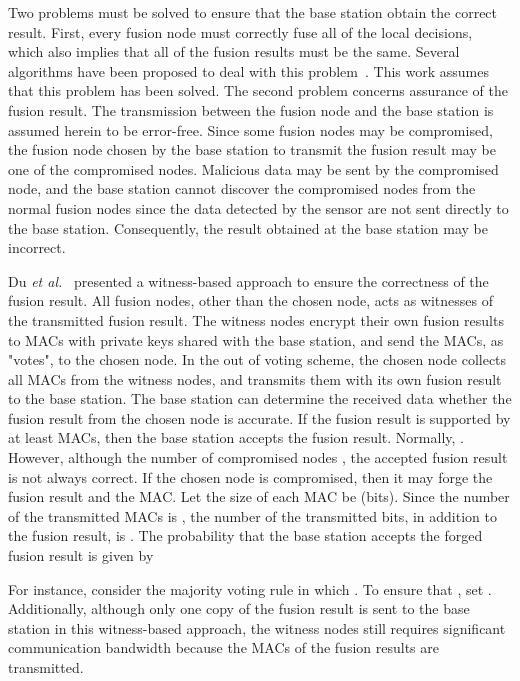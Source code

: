 \documentclass[12pt, onecolumn, draftcls]{IEEEtran}
\begin{document}
Two problems must be solved to ensure that the base station obtain
the correct result. First, every fusion node must correctly fuse all
of the local decisions, which also implies that all of the fusion
results must be the same. Several algorithms have been proposed to
deal with this
problem~\cite{varshney:dd,costa:dc,wang:dc_ft,wang:df_cc}. This work
assumes that this problem has been solved. The second problem
concerns assurance of the fusion result. The transmission between
the fusion node and the base station is assumed herein to be
error-free. Since some fusion nodes may be compromised, the fusion
node chosen by the base station to transmit the fusion result may be
one of the compromised nodes. Malicious data may be sent by the
compromised node, and the base station cannot discover the
compromised nodes from the normal fusion nodes since the data
detected by the sensor are not sent directly to the base station.
Consequently, the result obtained at the base station may be
incorrect.

Du {\it et al.}~\cite{du:assurance} presented a witness-based
approach to ensure the correctness of the fusion result. All fusion
nodes, other than the chosen node, acts as witnesses of the
transmitted fusion result. The witness nodes encrypt their own
fusion results to MACs with private keys shared with the base
station, and send the MACs, as "votes", to the chosen node. In the
 out of  voting scheme, the chosen node collects all MACs
from the witness nodes, and transmits them with its own fusion
result to the base station. The base station can determine the
received data whether the fusion result from the chosen node is
accurate. If the fusion result is supported by at least  MACs,
then the base station accepts the fusion result. Normally,  . However, although the number of compromised
nodes , the accepted fusion result is not always correct. If
the chosen node is compromised, then it may forge the fusion result
and the MAC. Let the size of each MAC be  (bits). Since the
number of the transmitted MACs is , the number of the
transmitted bits, in addition to the fusion result, is .
The probability that the base station accepts the forged fusion
result is given by

For instance, consider the majority voting rule in which . To ensure that , set
. Additionally, although
only one copy of the fusion result is sent to the base station in
this witness-based approach, the witness nodes still requires
significant communication bandwidth because the MACs of the fusion
results are transmitted.
\end{document}

